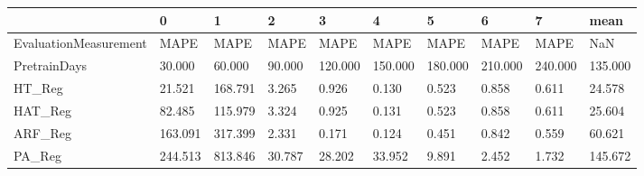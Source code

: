 \begin{tabular}{llllllllll}
\toprule
{} &       0 &       1 &      2 &       3 &       4 &       5 &       6 &       7 &    mean \\
\midrule
EvaluationMeasurement &    MAPE &    MAPE &   MAPE &    MAPE &    MAPE &    MAPE &    MAPE &    MAPE &     NaN \\
PretrainDays          &  30.000 &  60.000 & 90.000 & 120.000 & 150.000 & 180.000 & 210.000 & 240.000 & 135.000 \\
HT\_Reg                &  21.521 & 168.791 &  3.265 &   0.926 &   0.130 &   0.523 &   0.858 &   0.611 &  24.578 \\
HAT\_Reg               &  82.485 & 115.979 &  3.324 &   0.925 &   0.131 &   0.523 &   0.858 &   0.611 &  25.604 \\
ARF\_Reg               & 163.091 & 317.399 &  2.331 &   0.171 &   0.124 &   0.451 &   0.842 &   0.559 &  60.621 \\
PA\_Reg                & 244.513 & 813.846 & 30.787 &  28.202 &  33.952 &   9.891 &   2.452 &   1.732 & 145.672 \\
\bottomrule
\end{tabular}
